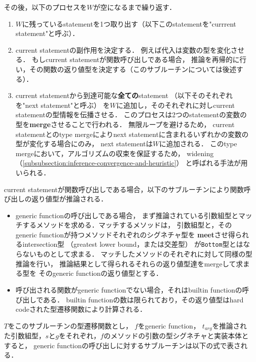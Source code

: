 その後，以下のプロセスを\(W\)が空になるまで繰り返す．

\begin{enumerate}
  \item \(W\)に残っているstatementを1つ取り出す（以下このstatementを"currrent statement"と呼ぶ）．
  \item current statementの副作用を決定する．
        例えば代入は変数の型を変化させる．
        もしcurrent statementが関数呼び出しである場合，
        推論を再帰的に行い，その関数の返り値型を決定する（このサブルーチンについては後述する）．
  \item current statementから到達可能な\textbf{全ての}statement
        （以下そのそれぞれを"next statement"と呼ぶ）
        を\(W\)に追加し，そのそれぞれに対しcurrent statementの型情報を伝播させる．
        このプロセスは2つのstatementの変数の型を\textbf{merge}させることで行われる．
        無限ループを避けるため，
        current statementとのtype mergeによりnext statementに含まれるいずれかの変数の型が変化する場合にのみ，
        next statementは\(W\)に追加される．
        このtype mergeにおいて，アルゴリズムの収束を保証するため，
        widening（\ref{subsubsection:inference-convergence-and-heuristic}）
        と呼ばれる手法が用いられる．
\end{enumerate}

\newpage

current statementが関数呼び出しである場合，以下のサブルーチンにより関数呼び出しの返り値型が推論される．

\begin{itemize}
  \item generic functionの呼び出しである場合，
        まず推論されている引数組型とマッチするメソッドを求める．マッチするメソッドは，
        引数組型と，そのgeneric functionが持つメソッドそれぞれのシグネチャ型を
        \textbf{meet}させ得られるintersection型
        （greatest lower bound，または交差型）\footnotemark
        が\texttt{Bottom}型とはならないものとして求まる．
        マッチしたメソッドのそれぞれに対して同様の型推論を行い，
        推論結果として得られるそれらの返り値型達をmergeして求まる型を
        そのgeneric functionの返り値型とする．
  \item 呼び出される関数がgeneric functionでない場合，それはbuiltin functionの呼び出しである．
        builtin functionの数は限られており，その返り値型はhard codeされた型遷移関数により計算される．
\end{itemize}

\(T\)をこのサブルーチンの型遷移関数とし，
\(f\)をgeneric function，
\(t_{arg}\)を推論された引数組型，\(s\)と\(g\)をそれぞれ，\(f\)のメソッドの引数の型シグネチャと実装本体とすると，
generic functionの呼び出しに対するサブルーチンは以下の式で表される．

